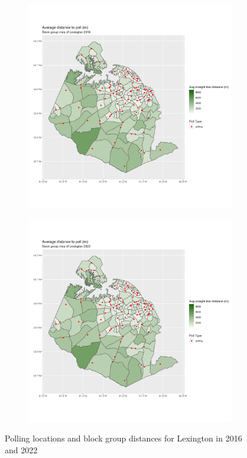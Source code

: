 \documentclass[11pt]{article}
\theoremstyle{remark}
\theoremstyle{definition}
\begin{document}
\begin{figure}
	\begin{subfigure}{.5\textwidth}
		\centering
		\includegraphics[width=\linewidth]{result_analysis/Lexington_County_SC_original_configs/distance_map_Lexington_config_original_2016_polls.png}
		\label{sfig:York_2016_bg_dist}
	\end{subfigure} 
	\begin{subfigure}{.5\textwidth}
		\centering
		\includegraphics[width=\linewidth]{result_analysis/Lexington_County_SC_original_configs/distance_map_Lexington_config_original_2022_polls.png}
		\label{sfig:Lexington_2022_bg_dist}
	\end{subfigure}
	\caption{Polling locations and block group distances for Lexington in 2016 and 2022}
	\label{fig:Lexington distance maps}
\end{figure}
\end{document}
